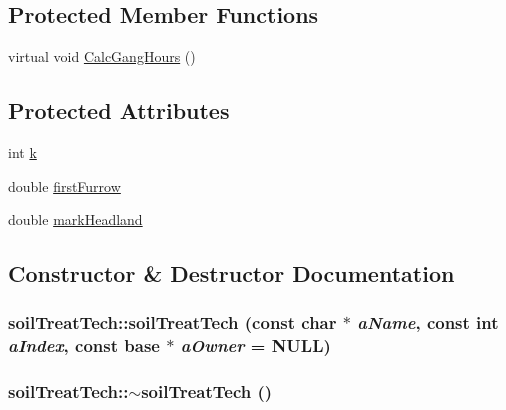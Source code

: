 \subsection*{Protected Member Functions}
\begin{DoxyCompactItemize}
\item 
virtual void \hyperlink{classsoil_treat_tech_a8cb69be7b91ff19c7ced98d10d8a3ff5}{CalcGangHours} ()
\end{DoxyCompactItemize}
\subsection*{Protected Attributes}
\begin{DoxyCompactItemize}
\item 
int \hyperlink{classsoil_treat_tech_a82f97281d5fbea96370f73eba5b37260}{k}
\item 
double \hyperlink{classsoil_treat_tech_a8a452833fde1e89e811dab21c30265e6}{firstFurrow}
\item 
double \hyperlink{classsoil_treat_tech_aed4d8643a628c0552169d6e0b7773cbc}{markHeadland}
\end{DoxyCompactItemize}


\subsection{Constructor \& Destructor Documentation}
\hypertarget{classsoil_treat_tech_a4c26ebd0f19485caa234d5331b440cf3}{
\subsubsection[{soilTreatTech}]{\setlength{\rightskip}{0pt plus 5cm}soilTreatTech::soilTreatTech (const char $\ast$ {\em aName}, \/  const int {\em aIndex}, \/  const {\bf base} $\ast$ {\em aOwner} = {\ttfamily NULL})}}
\label{classsoil_treat_tech_a4c26ebd0f19485caa234d5331b440cf3}
\hypertarget{classsoil_treat_tech_ad59b0663ed3e4f6510c52b943e8eb028}{
\subsubsection[{$\sim$soilTreatTech}]{\setlength{\rightskip}{0pt plus 5cm}soilTreatTech::$\sim$soilTreatTech ()}}
\label{classsoil_treat_tech_ad59b0663ed3e4f6510c52b943e8eb028}


